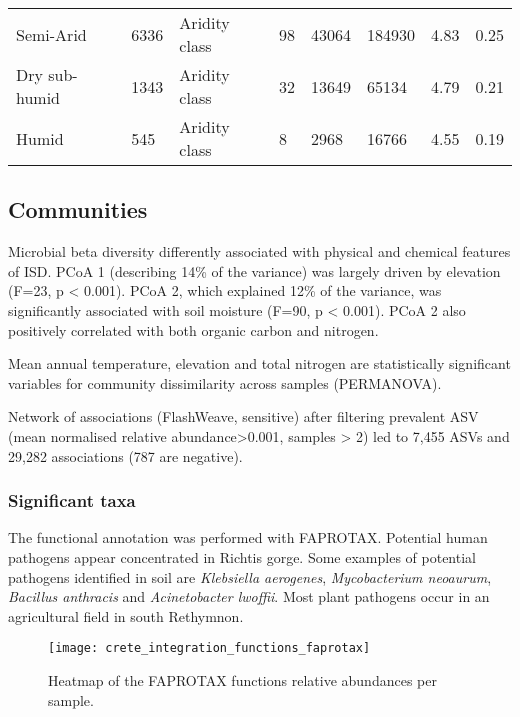 \begin{sidewaystable*}
\begin{tabular*}{\textwidth}{@{\extracolsep{\fill}}llllllll@{\extracolsep{\fill}}}
Semi-Arid                                       & 6336 & Aridity class        & 98      & 43064          & 184930        & 4.83          & 0.25        \\
Dry sub-humid                                   & 1343 & Aridity class        & 32      & 13649          & 65134         & 4.79          & 0.21        \\
Humid                                           & 545  & Aridity class        & 8       & 2968           & 16766         & 4.55          & 0.19       
\end{tabular*}
\end{sidewaystable*}


\subsection{Communities}\label{communities}
Microbial beta diversity differently associated with physical and chemical
features of ISD. PCoA 1 (describing 14\% of the variance) was largely driven by
elevation (F=23, p < 0.001). PCoA 2, which explained 12\% of the variance,
was significantly associated with soil moisture (F=90, p < 0.001).
PCoA 2 also positively correlated with both organic carbon and nitrogen.

Mean annual temperature, elevation and total nitrogen are statistically significant variables for
community dissimilarity across samples (PERMANOVA).

Network of associations (FlashWeave, sensitive) after filtering prevalent ASV (mean normalised relative
abundance>0.001, samples > 2) led to 7,455 ASVs and
29,282 associations (787 are negative).

\subsubsection{Significant taxa}\label{sig_taxa}
The functional annotation was performed with FAPROTAX. Potential human pathogens 
appear concentrated in Richtis gorge. Some examples of potential pathogens identified in soil 
are \textit{Klebsiella aerogenes}, \textit{Mycobacterium neoaurum}, \textit{Bacillus anthracis} and \textit{Acinetobacter lwoffii}.
Most plant pathogens occur in an agricultural field in south Rethymnon. 

\begin{figure}[t] 
    \centering\texttt{[image: crete\_integration\_functions\_faprotax]}
\caption{Heatmap of the FAPROTAX functions relative abundances per sample.}
    \label{fig:isd_functions_faprotax}
\end{figure}

